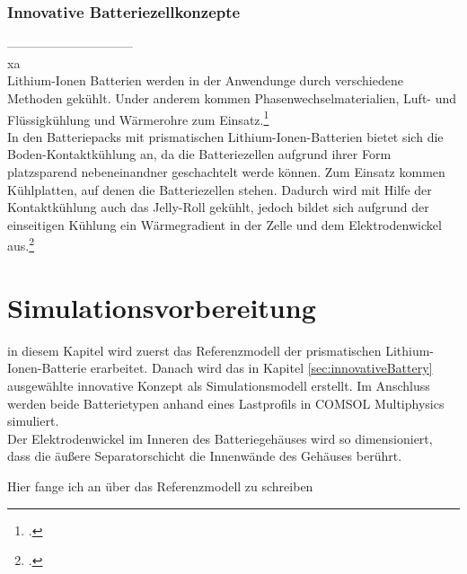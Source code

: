\subsubsection{Innovative Batteriezellkonzepte}\label{subsub:innovativeBatteriezellkonzepte}












\newpage
------------------------------\\
xa\\%
Lithium-Ionen Batterien werden in der Anwendunge durch verschiedene Methoden gekühlt. Under anderem kommen Phasenwechselmaterialien, Luft- und Flüssigkühlung und Wärmerohre zum Einsatz.\footcite[Vgl.][S. 1,2]{Mohammed.2018}\\
In den Batteriepacks mit prismatischen Lithium-Ionen-Batterien bietet sich die Boden-Kontaktkühlung an, da die Batteriezellen aufgrund ihrer Form platzsparend nebeneinandner geschachtelt werde können. Zum Einsatz kommen Kühlplatten, auf denen die Batteriezellen stehen. %
Dadurch wird mit Hilfe der Kontaktkühlung auch das Jelly-Roll gekühlt, jedoch bildet sich aufgrund der einseitigen Kühlung ein Wärmegradient in der Zelle und dem Elektrodenwickel aus.\footcite[Vgl.][S. 2107]{Inui.2007}

\newpage
\section{Simulationsvorbereitung}\label{sec:SimulationPREP}

in diesem Kapitel wird zuerst das Referenzmodell der prismatischen Lithium-Ionen-Batterie erarbeitet. Danach wird das in Kapitel \ref{sec:innovativeBattery} ausgewählte innovative Konzept als Simulationsmodell erstellt. Im Anschluss werden beide Batterietypen anhand eines Lastprofils in COMSOL Multiphysics\textsuperscript{\textregistered} simuliert.\\



Der Elektrodenwickel im Inneren des Batteriegehäuses wird so dimensioniert, dass die äußere Separatorschicht die Innenwände des Gehäuses berührt.

Hier fange ich an über das Referenzmodell zu schreiben


	